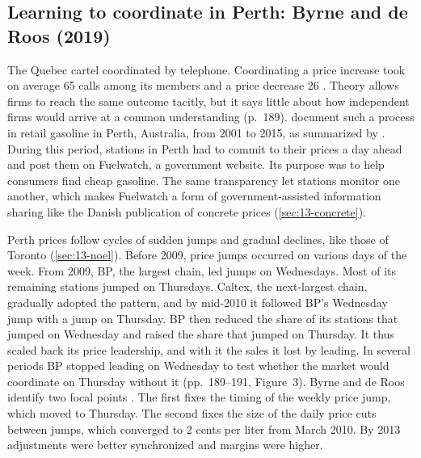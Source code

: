 \subsection{Learning to coordinate in Perth: Byrne and de Roos (2019)}\label{sec:13-perth}

The Quebec cartel coordinated by telephone. Coordinating a price increase took on average 65 calls among its members
and a price decrease 26 \citep[pp.~195--196]{AskerNocke2021}. Theory allows firms to reach the same outcome tacitly,
but it says little about how independent firms would arrive at a common understanding (p.~189).
\citet{ByrneDeRoos2019} document such a process in retail gasoline in Perth, Australia, from 2001 to 2015, as
summarized by \citet[pp.~189--191]{AskerNocke2021}. During this period, stations in Perth had to commit to their prices a
day ahead and post them on Fuelwatch, a government website. Its purpose was to help consumers find cheap gasoline.
The same transparency let stations monitor one another, which makes Fuelwatch a form of government-assisted
information sharing like the Danish publication of concrete prices (\cref{sec:13-concrete}).

Perth prices follow cycles of sudden jumps and gradual declines, like those of Toronto (\cref{sec:13-noel}). Before
2009, price jumps occurred on various days of the week. From 2009, BP, the largest chain, led jumps on Wednesdays.
Most of its remaining stations jumped on Thursdays. Caltex, the next-largest chain, gradually adopted the pattern,
and by mid-2010 it followed BP's Wednesday jump with a jump on Thursday. BP then reduced the share of its stations
that jumped on Wednesday and raised the share that jumped on Thursday. It thus scaled back its price leadership, and
with it the sales it lost by leading. In several periods BP stopped leading on Wednesday to test whether the market
would coordinate on Thursday without it (pp.~189--191, Figure~3). Byrne and de Roos identify two focal points
\citep[pp.~596--597 and 607--608]{ByrneDeRoos2019}. The first fixes the timing of the weekly price jump, which moved
to Thursday. The second fixes the size of the daily price cuts between jumps, which converged to 2 cents per liter
from March 2010. By 2013 adjustments were better synchronized and margins were higher.

